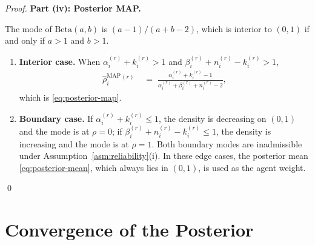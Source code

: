\documentclass[12pt,openany]{book}
\numberwithin{equation}{chapter}
\theoremstyle{plain}
\theoremstyle{definition}
\theoremstyle{remark}
\numberwithin{equation}{chapter}
\theoremstyle{plain}
\begin{document}
\begin{proof}
\medskip
\noindent\textbf{Part (iv): Posterior MAP.}

The mode of $\mathrm{Beta}(a,b)$ is $(a-1)/(a+b-2)$, which
is interior to $(0,1)$ if and only if $a > 1$ and $b > 1$.
\begin{enumerate}
  \item[\textup{(a)}] \textbf{Interior case.}
        When $\alpha_i^{(r)} + k_i^{(r)} > 1$ and
        $\beta_i^{(r)} + n_i^{(r)} - k_i^{(r)} > 1$,
        \begin{align}
          \hat{\rho}^{\mathrm{MAP}}_{i}{}^{(r)}
          &\;=\;
          \frac{\alpha_i^{(r)} + k_i^{(r)} - 1}
               {\alpha_i^{(r)} + \beta_i^{(r)} + n_i^{(r)} - 2},
          \label{eq:map-interior}
        \end{align}
        which is \eqref{eq:posterior-map}.

  \item[\textup{(b)}] \textbf{Boundary case.}
        If $\alpha_i^{(r)} + k_i^{(r)} \leq 1$, the density
        is decreasing on $(0,1)$ and the mode is at $\rho = 0$;
        if $\beta_i^{(r)} + n_i^{(r)} - k_i^{(r)} \leq 1$,
        the density is increasing and the mode is at $\rho = 1$.
        Both boundary modes are inadmissible under
        Assumption~\ref{asm:reliability}(i).  In these
        edge cases, the posterior mean \eqref{eq:posterior-mean},
        which always lies in $(0,1)$, is used as the agent
        weight.
\end{enumerate}
\qed
\end{proof}

\section{Convergence of the Posterior}
\end{document}
